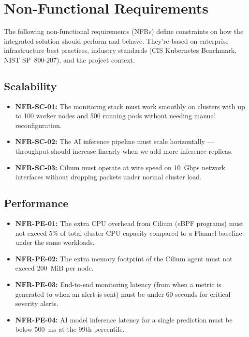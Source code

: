 \chapter{Non-Functional Requirements}
\label{chapter:requirements}

The following non-functional requirements (NFRs) define constraints on how the integrated solution should perform and behave. They're based on enterprise infrastructure best practices, industry standards (CIS Kubernetes Benchmark, NIST SP~800-207), and the project context.

\section{Scalability}

\begin{itemize}
    \item \textbf{NFR-SC-01:} The monitoring stack must work smoothly on clusters with up to 100 worker nodes and 500 running pods without needing manual reconfiguration.
    \item \textbf{NFR-SC-02:} The AI inference pipeline must scale horizontally — throughput should increase linearly when we add more inference replicas.
    \item \textbf{NFR-SC-03:} Cilium must operate at wire speed on 10~Gbps network interfaces without dropping packets under normal cluster load.
\end{itemize}

\section{Performance}

\begin{itemize}
    \item \textbf{NFR-PE-01:} The extra CPU overhead from Cilium (eBPF programs) must not exceed 5\% of total cluster CPU capacity compared to a Flannel baseline under the same workloads.
    \item \textbf{NFR-PE-02:} The extra memory footprint of the Cilium agent must not exceed 200~MiB per node.
    \item \textbf{NFR-PE-03:} End-to-end monitoring latency (from when a metric is generated to when an alert is sent) must be under 60 seconds for critical severity alerts.
    \item \textbf{NFR-PE-04:} AI model inference latency for a single prediction must be below 500~ms at the 99th percentile.
\end{itemize}

